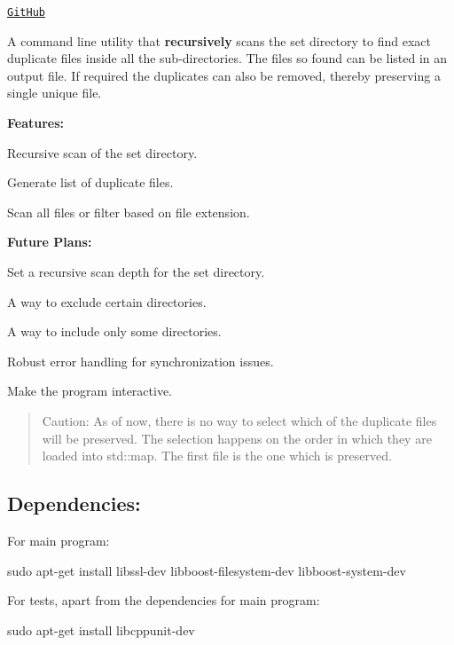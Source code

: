 \href{https://github.com/vishal-wadhwa/Duplicate-File-Remover}{\tt Git\+Hub}

A command line utility that {\bfseries recursively} scans the set directory to find exact duplicate files inside all the sub-\/directories. The files so found can be listed in an output file. If required the duplicates can also be removed, thereby preserving a single unique file.

\href{https://asciinema.org/a/CgLfUrJvV3If2ifGZNhdDC8iu?autoplay=1}{\tt }

{\bfseries Features\+:}
\begin{DoxyEnumerate}
\item Recursive scan of the set directory.
\item Generate list of duplicate files.
\item Scan all files or filter based on file extension.
\end{DoxyEnumerate}

{\bfseries Future Plans\+:}
\begin{DoxyEnumerate}
\item Set a recursive scan depth for the set directory.
\item A way to exclude certain directories.
\item A way to include only some directories.
\item Robust error handling for synchronization issues.
\item Make the program interactive.
\end{DoxyEnumerate}

\begin{quote}
Caution\+: As of now, there is no way to select which of the duplicate files will be preserved. The selection happens on the order in which they are loaded into {\ttfamily std\+::map}. The first file is the one which is preserved. \end{quote}


\subsection*{\label{_dep}%
Dependencies\+:}


\begin{DoxyEnumerate}
\item For main program\+:

{\ttfamily sudo apt-\/get install libssl-\/dev libboost-\/filesystem-\/dev libboost-\/system-\/dev}
\item For tests, apart from the dependencies for main program\+:

{\ttfamily sudo apt-\/get install libcppunit-\/dev}
\end{DoxyEnumerate}

